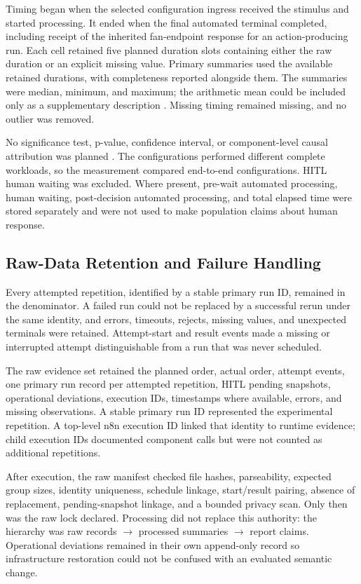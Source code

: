 Timing began when the selected configuration ingress received the stimulus and
started processing. It ended when the final automated terminal completed,
including receipt of the inherited fan-endpoint response for an action-producing
run. Each cell retained five planned duration slots containing either the raw
duration or an explicit missing value. Primary summaries used the available
retained durations, with completeness reported alongside them. The summaries
were median, minimum, and maximum; the arithmetic mean could be included only
as a supplementary description \cite{nist2022descriptivestatistics}. Missing timing remained missing, and no
outlier was removed.

No significance test, p-value, confidence interval, or component-level causal
attribution was planned \cite{wohlin2012experimentation}. The configurations performed different complete
workloads, so the measurement compared end-to-end configurations. HITL human
waiting was excluded. Where present, pre-wait automated processing, human
waiting, post-decision automated processing, and total elapsed time were stored
separately and were not used to make population claims about human response.

\subsection[Raw-Data Retention and Failure Handling]{Raw-Data Retention and
\texorpdfstring{\newline}{ }Failure Handling}\label{subsec:method-raw}

Every attempted repetition, identified by a stable primary run ID, remained in
the denominator. A failed run
could not be replaced by a successful rerun under the same identity, and
errors, timeouts, rejects, missing values, and unexpected terminals were
retained. Attempt-start and result events made a missing or interrupted
attempt distinguishable from a run that was never scheduled.

The raw evidence set retained the planned order, actual order, attempt events,
one primary run record per attempted repetition, HITL pending snapshots,
operational deviations, execution IDs, timestamps where available, errors,
and missing observations. A stable primary run ID represented the experimental
repetition. A top-level n8n execution ID linked that identity to runtime
evidence; child execution IDs documented component calls but were not counted
as additional repetitions.

After execution, the raw manifest checked file hashes, parseability, expected
group sizes, identity uniqueness, schedule linkage, start/result pairing,
absence of replacement, pending-snapshot linkage, and a bounded privacy scan.
Only then was the raw lock declared. Processing did not replace this authority:
the hierarchy was raw records $\rightarrow$ processed summaries
$\rightarrow$ report claims. Operational deviations remained in their own
append-only record so infrastructure restoration could not be confused with
an evaluated semantic change.

